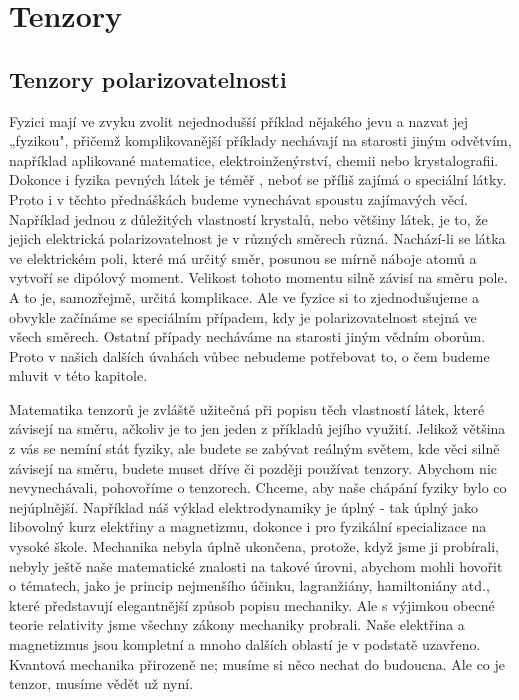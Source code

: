 \setchaptertoc
\chapter{Tenzory}\label{fyz:IIchapXXXI}

  \section{Tenzory polarizovatelnosti}\label{fyz:IIchapXXXIsecI}
    Fyzici mají ve zvyku zvolit nejednodušší příklad nějakého jevu a nazvat jej „fyzikou", přičemž
    komplikovanější příklady nechávají na starosti jiným odvětvím, například aplikované matematice,
    elektroinženýrství, chemii nebo krystalografii. Dokonce i fyzika pevných látek je téměř
    , neboť se příliš zajímá o speciální látky. Proto i v těchto přednáškách budeme
    vynechávat spoustu zajímavých věcí. Například jednou z důležitých vlastností krystalů, nebo
    většiny látek, je to, že jejich elektrická polarizovatelnost je v různých směrech různá.
    Nachází-li se látka ve elektrickém poli, které má určitý směr, posunou se mírně náboje atomů a
    vytvoří se dipólový moment. Velikost tohoto momentu silně závisí na směru pole. A to je,
    samozřejmě, určitá komplikace. Ale ve fyzice si to zjednodušujeme a obvykle začínáme se
    speciálním případem, kdy je polarizovatelnost stejná ve všech směrech. Ostatní případy necháváme
    na starosti jiným vědním oborům. Proto v našich dalších úvahách vůbec nebudeme potřebovat to, o
    čem budeme mluvit v této kapitole.
    
    Matematika tenzorů je zvláště užitečná při popisu těch vlastností látek, které závisejí na
    směru, ačkoliv je to jen jeden z příkladů jejího využití. Jelikož většina z vás se nemíní stát
    fyziky, ale budete se zabývat reálným světem, kde věci silně závisejí na směru, budete muset
    dříve či později používat tenzory. Abychom nic nevynechávali, pohovoříme o tenzorech. Chceme,
    aby naše chápání fyziky bylo co nejúplnější. Například náš výklad elektrodynamiky je úplný - tak
    úplný jako libovolný kurz elektřiny a magnetizmu, dokonce i pro fyzikální specializace na vysoké
    škole. Mechanika nebyla úplně ukončena, protože, když jsme ji probírali, nebyly ještě naše
    matematické znalosti na takové úrovni, abychom mohli hovořit o tématech, jako je princip
    nejmenšího účinku, lagranžiány, hamiltoniány atd., které představují elegantnější způsob popisu
    mechaniky. Ale s výjimkou obecné teorie relativity jsme všechny zákony mechaniky probrali. Naše
    elektřina a magnetizmus jsou kompletní a mnoho dalších oblastí je v podstatě uzavřeno. Kvantová
    mechanika přirozeně ne; musíme si něco nechat do budoucna. Ale co je tenzor, musíme vědět už
    nyní. 

